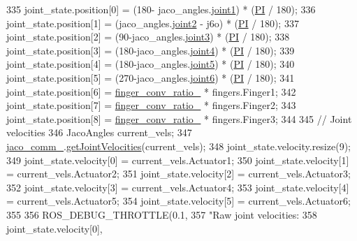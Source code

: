 \begin{DoxyCode}
335     joint\_state.position[0] = (180- jaco\_angles.\hyperlink{structjaco__msgs_1_1JointAngles___a5ebadd874f74af99d452dc42787489b7}{joint1}) * (\hyperlink{jaco__arm_8cpp_a598a3330b3c21701223ee0ca14316eca}{PI} / 180);
336     joint\_state.position[1] = (jaco\_angles.\hyperlink{structjaco__msgs_1_1JointAngles___ad7bfb312caeafc6b2cb1fc02c6a3e116}{joint2} - j6o) * (\hyperlink{jaco__arm_8cpp_a598a3330b3c21701223ee0ca14316eca}{PI} / 180);
337     joint\_state.position[2] = (90-jaco\_angles.\hyperlink{structjaco__msgs_1_1JointAngles___ae8e5d407b34f0a6acd368ec1a28df526}{joint3}) * (\hyperlink{jaco__arm_8cpp_a598a3330b3c21701223ee0ca14316eca}{PI} / 180);
338     joint\_state.position[3] = (180-jaco\_angles.\hyperlink{structjaco__msgs_1_1JointAngles___accb31f45f3a313794a9cab57b8a9b952}{joint4}) * (\hyperlink{jaco__arm_8cpp_a598a3330b3c21701223ee0ca14316eca}{PI} / 180);
339     joint\_state.position[4] = (180-jaco\_angles.\hyperlink{structjaco__msgs_1_1JointAngles___ad02e456e0b382b2bf59b4eeb93318921}{joint5}) * (\hyperlink{jaco__arm_8cpp_a598a3330b3c21701223ee0ca14316eca}{PI} / 180);
340     joint\_state.position[5] = (270-jaco\_angles.\hyperlink{structjaco__msgs_1_1JointAngles___a474d9f2a0e329ba6bd08c8fa265e9a50}{joint6}) * (\hyperlink{jaco__arm_8cpp_a598a3330b3c21701223ee0ca14316eca}{PI} / 180);
341     joint\_state.position[6] = \hyperlink{classjaco_1_1JacoArm_a45f8b1fbeec4d1abfcad6d3f9e65b6ca}{finger\_conv\_ratio\_} * fingers.Finger1;
342     joint\_state.position[7] = \hyperlink{classjaco_1_1JacoArm_a45f8b1fbeec4d1abfcad6d3f9e65b6ca}{finger\_conv\_ratio\_} * fingers.Finger2;
343     joint\_state.position[8] = \hyperlink{classjaco_1_1JacoArm_a45f8b1fbeec4d1abfcad6d3f9e65b6ca}{finger\_conv\_ratio\_} * fingers.Finger3;
344 
345     \textcolor{comment}{// Joint velocities}
346     JacoAngles current\_vels;
347     \hyperlink{classjaco_1_1JacoArm_a2f9cbba855994058b82c0f4628349286}{jaco\_comm\_}.\hyperlink{classjaco_1_1JacoComm_aa81b5cdf89bd2c7259be3638fdb4f75a}{getJointVelocities}(current\_vels);
348     joint\_state.velocity.resize(9);
349     joint\_state.velocity[0] = current\_vels.Actuator1;
350     joint\_state.velocity[1] = current\_vels.Actuator2;
351     joint\_state.velocity[2] = current\_vels.Actuator3;
352     joint\_state.velocity[3] = current\_vels.Actuator4;
353     joint\_state.velocity[4] = current\_vels.Actuator5;
354     joint\_state.velocity[5] = current\_vels.Actuator6;
355 
356     ROS\_DEBUG\_THROTTLE(0.1,
357                        \textcolor{stringliteral}{"Raw joint velocities: %
358                        joint\_state.velocity[0],
}
\end{DoxyCode}
